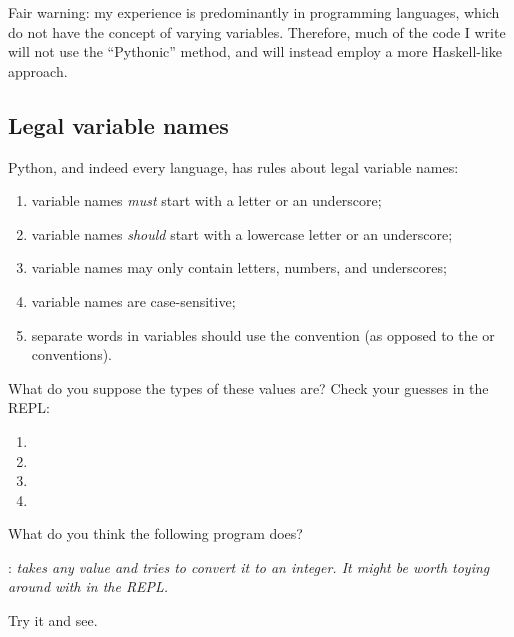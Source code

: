 \begin{remark}
  Fair warning: my experience is predominantly in 
  programming languages, which do not have the concept of varying
  variables. Therefore, much of the code I write will not use the
  ``Pythonic'' method, and will instead employ a more Haskell-like
  approach.
\end{remark}

\subsection{Legal variable names}

Python, and indeed every language, has rules about legal variable
names:

\begin{enumerate}
\item variable names \emph{must} start with a letter or an underscore;
\item variable names \emph{should} start with a lowercase letter or an
  underscore;
\item variable names may only contain letters, numbers, and underscores;
\item variable names are case-sensitive;
\item separate words in variables should use the 
  convention (as opposed to the  or
   conventions).
\end{enumerate}

\begin{exercise}
  What do you suppose the types of these values are? Check your
  guesses in the REPL:

  \begin{enumerate}
  \item {}
  \item {}
  \item {}
  \item {}
  \end{enumerate}
\end{exercise}

\begin{exercise}
  What do you think the following program does?


  : \emph{ takes any value and tries to convert
    it to an integer. It might be worth toying around with
     in the REPL.}

  Try it and see.
\end{exercise}

